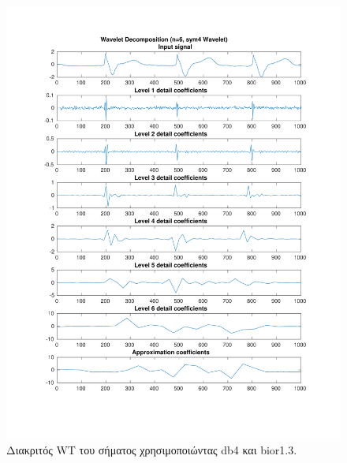 \documentclass[11pt,a4paper]{article}
\begin{document}
\begin{figure}[H]
\begin{minipage}{0.48\textwidth}
	\includegraphics[width=\textwidth]{fig/217l1_dwt2.pdf}
\end{minipage}
\vfill
\caption{Διακριτός WT του σήματος χρησιμοποιώντας db4 και bior1.3.}
\label{fig:217l1_dwt}
\end{figure}
\end{document}

